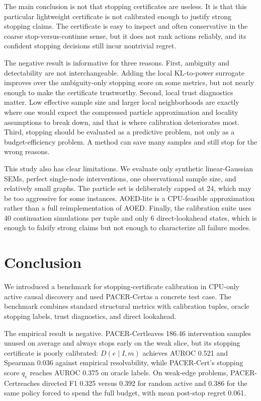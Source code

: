 \documentclass{article}
\newcommand{\method}{PACER-Cert}
\newcommand{\qe}{q_e}
\newcommand{\de}{D}
\begin{document}
The main conclusion is not that stopping certificates are useless. It is that this particular lightweight certificate is not calibrated enough to justify strong stopping claims. The certificate is easy to inspect and often conservative in the coarse stop-versus-continue sense, but it does not rank actions reliably, and its confident stopping decisions still incur nontrivial regret.

The negative result is informative for three reasons. First, ambiguity and detectability are not interchangeable. Adding the local KL-to-power surrogate improves over the ambiguity-only stopping score on some metrics, but not nearly enough to make the certificate trustworthy. Second, local trust diagnostics matter. Low effective sample size and larger local neighborhoods are exactly where one would expect the compressed particle approximation and locality assumptions to break down, and that is where calibration deteriorates most. Third, stopping should be evaluated as a predictive problem, not only as a budget-efficiency problem. A method can save many samples and still stop for the wrong reasons.

This study also has clear limitations. We evaluate only synthetic linear-Gaussian SEMs, perfect single-node interventions, one observational sample size, and relatively small graphs. The particle set is deliberately capped at 24, which may be too aggressive for some instances. AOED-lite is a CPU-feasible approximation rather than a full reimplementation of AOED. Finally, the calibration suite uses 40 continuation simulations per tuple and only 6 direct-lookahead states, which is enough to falsify strong claims but not enough to characterize all failure modes.

\section{Conclusion}
\label{sec:conclusion}

We introduced a benchmark for stopping-certificate calibration in CPU-only active causal discovery and used \method as a concrete test case. The benchmark combines standard structural metrics with calibration tuples, oracle stopping labels, trust diagnostics, and direct lookahead.

The empirical result is negative. \method leaves 186.46 intervention samples unused on average and always stops early on the weak slice, but its stopping certificate is poorly calibrated: $\de(e\mid I,m)$ achieves AUROC 0.521 and Spearman 0.036 against empirical resolvability, while \method's stopping score $\qe$ reaches AUROC 0.375 on oracle labels. On weak-edge problems, \method reaches directed F1 0.325 versus 0.392 for random active and 0.386 for the same policy forced to spend the full budget, with mean post-stop regret 0.061.
\end{document}
